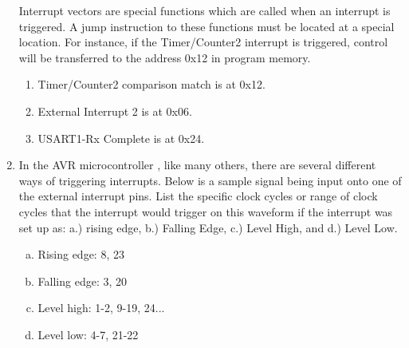 \documentclass[12pt,letterpaper]{article}
\begin{document}
\begin{enumerate}
    Interrupt vectors are special functions which are called when an interrupt
is triggered. A jump instruction to these functions must be located at a special location. For instance, if the Timer/Counter2 interrupt is triggered, control will be transferred to the address 0x12 in program memory.
    \begin{enumerate}
        \item Timer/Counter2 comparison match is at 0x12.
        \item External Interrupt 2 is at 0x06.
        \item USART1-Rx Complete is at 0x24.
    \end{enumerate}

    \item In the AVR microcontroller , like many others, there are several different ways of triggering interrupts. Below is a sample signal being input onto one of the external interrupt pins.  List the specific clock cycles or range of clock cycles that the interrupt would trigger on this waveform if the interrupt was set up as: a.) rising edge, b.) Falling Edge, c.) Level High, and d.) Level Low.
    \begin{enumerate}[(a)]
        \item Rising edge: 8, 23\\
        \item Falling edge: 3, 20\\
        \item Level high: 1-2, 9-19, 24...\\
        \item Level low: 4-7, 21-22\\
    \end{enumerate}
\end{enumerate} 
\end{document}
